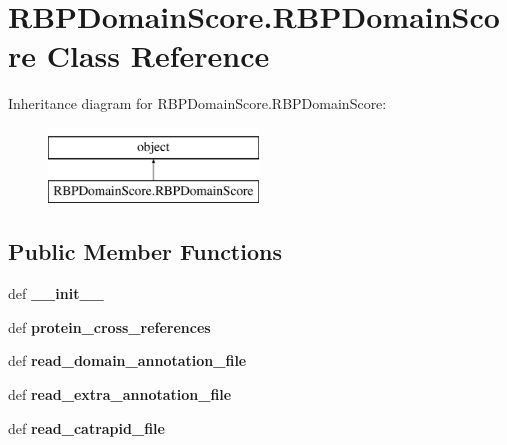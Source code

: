 \hypertarget{classRBPDomainScore_1_1RBPDomainScore}{\section{R\-B\-P\-Domain\-Score.\-R\-B\-P\-Domain\-Score Class Reference}
\label{classRBPDomainScore_1_1RBPDomainScore}
}
Inheritance diagram for R\-B\-P\-Domain\-Score.\-R\-B\-P\-Domain\-Score\-:\begin{figure}[H]
\begin{center}
\leavevmode
\includegraphics[height=2.000000cm]{classRBPDomainScore_1_1RBPDomainScore}
\end{center}
\end{figure}
\subsection*{Public Member Functions}
\begin{DoxyCompactItemize}
\item 
\hypertarget{classRBPDomainScore_1_1RBPDomainScore_a2183bb946ceaf3e3b940fed4b8a6b76e}{def {\bfseries \-\_\-\-\_\-init\-\_\-\-\_\-}}\label{classRBPDomainScore_1_1RBPDomainScore_a2183bb946ceaf3e3b940fed4b8a6b76e}

\item 
\hypertarget{classRBPDomainScore_1_1RBPDomainScore_ab2cc0358515ffaa41653aebb077f88fd}{def {\bfseries protein\-\_\-cross\-\_\-references}}\label{classRBPDomainScore_1_1RBPDomainScore_ab2cc0358515ffaa41653aebb077f88fd}

\item 
\hypertarget{classRBPDomainScore_1_1RBPDomainScore_a504d1ef8391ed33eef9770a1cf3fa9ee}{def {\bfseries read\-\_\-domain\-\_\-annotation\-\_\-file}}\label{classRBPDomainScore_1_1RBPDomainScore_a504d1ef8391ed33eef9770a1cf3fa9ee}

\item 
\hypertarget{classRBPDomainScore_1_1RBPDomainScore_a8b979071424e812a53c51ab2a9eb8658}{def {\bfseries read\-\_\-extra\-\_\-annotation\-\_\-file}}\label{classRBPDomainScore_1_1RBPDomainScore_a8b979071424e812a53c51ab2a9eb8658}

\item 
\hypertarget{classRBPDomainScore_1_1RBPDomainScore_ac7cad29a1d1de2c70bbcdf0ccb740a7d}{def {\bfseries read\-\_\-catrapid\-\_\-file}}\label{classRBPDomainScore_1_1RBPDomainScore_ac7cad29a1d1de2c70bbcdf0ccb740a7d}

\end{DoxyCompactItemize}
